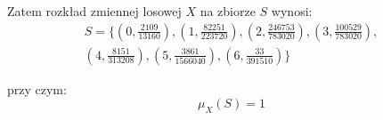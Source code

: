 \documentclass{article}
\begin{document}
Zatem rozkład zmiennej losowej \(X\) na zbiorze \(S\) wynosi:
\begin{align*} 
    S = \Big\{(0, \frac{2109}{13160}), (1, \frac{82251}{223720}), (2, \frac{246753}{783020}), (3, \frac{100529}{783020}), \\
             (4, \frac{8151}{313208}), (5, \frac{3861}{1566040}), (6, \frac{33}{391510})\Big\}
\end{align*}

przy czym:
\begin{equation*}
    \mu_{X}(S) = 1
\end{equation*}
\end{document}
